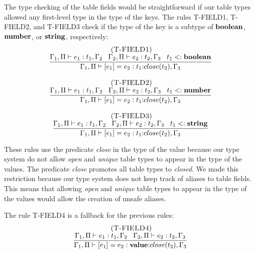 The type checking of the table fields would be straightforward
if our table types allowed any first-level type in the type of the keys.
The rules \textsc{T-FIELD1}, \textsc{T-FIELD2}, and \textsc{T-FIELD3}
check if the type of the key is a subtype of $\mathbf{boolean}$, $\mathbf{number}$,
or $\mathbf{string}$, respectively:
\[
\begin{array}{c}
\begin{array}{c}
\; (\textsc{T-FIELD1})\\
\dfrac{\Gamma_{1}, \Pi \vdash e_{1}:t_{1}, \Gamma_{2} \;\;\;
       \Gamma_{2}, \Pi \vdash e_{2}:t_{2}, \Gamma_{3} \;\;\;
       t_{1} <: \mathbf{boolean}}
      {\Gamma_{1}, \Pi \vdash [e_{1}] = e_{2}: t_{1}{:}close(t_{2}), \Gamma_{3}}
\end{array}
\\ \\
\begin{array}{c}
\; (\textsc{T-FIELD2})\\
\dfrac{\Gamma_{1}, \Pi \vdash e_{1}:t_{1}, \Gamma_{2} \;\;\;
       \Gamma_{2}, \Pi \vdash e_{2}:t_{2}, \Gamma_{3} \;\;\;
       t_{1} <: \mathbf{number}}
      {\Gamma_{1}, \Pi \vdash [e_{1}] = e_{2}: t_{1}{:}close(t_{2}), \Gamma_{3}}
\end{array}
\\ \\
\begin{array}{c}
\; (\textsc{T-FIELD3})\\
\dfrac{\Gamma_{1}, \Pi \vdash e_{1}:t_{1}, \Gamma_{2} \;\;\;
       \Gamma_{2}, \Pi \vdash e_{2}:t_{2}, \Gamma_{3} \;\;\;
       t_{1} <: \mathbf{string}}
      {\Gamma_{1}, \Pi \vdash [e_{1}] = e_{2}: t_{1}{:}close(t_{2}), \Gamma_{3}}
\end{array}
\end{array}
\]

These rules use the predicate \emph{close} in the type of the value
because our type system do not allow \emph{open} and \emph{unique}
table types to appear in the type of the values.
The predicate \emph{close} promotes all table types to \emph{closed}.
We made this restriction because our type system does not keep track
of aliases to table fields.
This means that allowing \emph{open} and \emph{unique} table types
to appear in the type of the values would allow the creation of
unsafe aliases.

The rule \textsc{T-FIELD4} is a fallback for the previous rules:
\[
\begin{array}{c}
\; (\textsc{T-FIELD4})\\
\dfrac{\Gamma_{1}, \Pi \vdash e_{1}:t_{1}, \Gamma_{2} \;\;\;
       \Gamma_{2}, \Pi \vdash e_{2}:t_{2}, \Gamma_{3}}
      {\Gamma_{1}, \Pi \vdash [e_{1}] = e_{2}: \mathbf{value}{:}close(t_{2}), \Gamma_{3}}
\end{array}
\]

